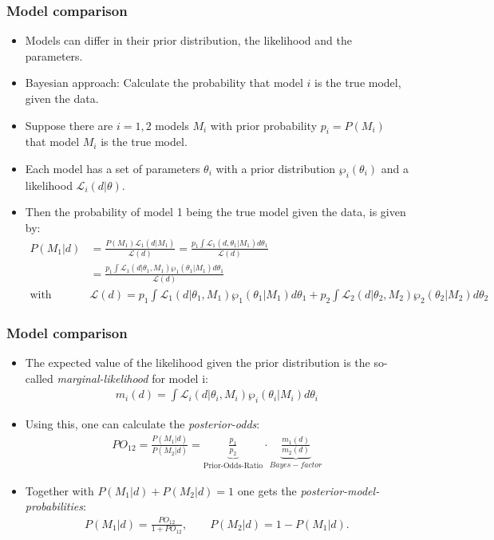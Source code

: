 \documentclass[handout]{beamer}  %
\begin{document}
\begin{frame}\frametitle{Model comparison}
  \begin{itemize}
    \item Models can differ in their prior distribution, the likelihood and the parameters.
    \item Bayesian approach: Calculate the probability that model $i$ is the true model, given the data.
    \item Suppose there are $i=1,2$ models $M_i$ with prior probability $p_i=P(M_i)$ that model $M_i$ is the true model.
    \item Each model has a set of parameters ${\theta_i}$ with a prior distribution $\wp_i({\theta_i})$ and a likelihood $\mathcal{L}_i({d}|{\theta})$.
    \item Then the probability of model 1 being the true model given the data, is given by:
    \scriptsize\begin{align*}
      P(M_1|d) &= \frac{P(M_1)\mathcal{L}_1({d}|M_1)}{\mathcal{L}({d})} = \frac{p_1 \int \mathcal{L}_1({d},{{\theta_1}}|M_1)d {\theta_1}}{\mathcal{L}({d})}\\
      &= \frac{p_1 \int \mathcal{L}_1({d}|{\theta_1},M_1) \wp_1({\theta_1}|M_1) d {\theta_1}}{\mathcal{L}({d})}\\
      \text{with }& \mathcal{L}({d}) = p_1 \int \mathcal{L}_1({d}|{\theta_1},M_1)\wp_1({\theta_1}|M_1)d{\theta_1} + p_2 \int \mathcal{L}_2({d}|{\theta_2},M_2)\wp_2({\theta_2}|M_2)d{\theta_2}
    \end{align*}
  \end{itemize}
\end{frame}

\begin{frame}\frametitle{Model comparison}
  \begin{itemize}
      \item The expected value of the likelihood given the prior distribution is the so-called \emph{marginal-likelihood} for model i:
    \begin{align*}
      m_i({d}) = \int \mathcal{L}_i({d}|{\theta_i},M_i)\wp_i({\theta_i}|M_i)d{\theta_i}
    \end{align*}
    \item Using this, one can calculate the \emph{posterior-odds}:
    \begin{align*}
      PO_{12} = \frac{P(M_1|{d})}{P(M_2|{d})} = \underbrace{\frac{p_1}{p_2}}_{\text{Prior-Odds-Ratio}}\cdot \underbrace{\frac{m_1({d})}{m_2({d})}}_{Bayes-factor}
    \end{align*}
    \item Together with $P(M_1|{d}) + P(M_2|{d}) =1$ one gets the \emph{posterior-model-probabilities}:
    \begin{align*}
      P(M_1|{d}) = \frac{PO_{12}}{1+PO_{12}}, \qquad P(M_2|{d}) = 1-P(M_1|{d}).
    \end{align*}
  \end{itemize}
\end{frame}
\end{document}
